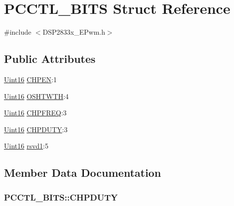 \hypertarget{struct_p_c_c_t_l___b_i_t_s}{}\section{P\+C\+C\+T\+L\+\_\+\+B\+I\+T\+S Struct Reference}
\label{struct_p_c_c_t_l___b_i_t_s}


{\ttfamily \#include $<$D\+S\+P2833x\+\_\+\+E\+Pwm.\+h$>$}

\subsection*{Public Attributes}
\begin{DoxyCompactItemize}
\item 
\hyperlink{_d_s_p2833x___device_8h_a59a9f6be4562c327cbfb4f7e8e18f08b}{Uint16} \hyperlink{struct_p_c_c_t_l___b_i_t_s_a0b4bc7768b79be8f8af5bd9af3bf050a}{C\+H\+P\+E\+N}\+:1
\item 
\hyperlink{_d_s_p2833x___device_8h_a59a9f6be4562c327cbfb4f7e8e18f08b}{Uint16} \hyperlink{struct_p_c_c_t_l___b_i_t_s_ae278a0bc2c79ef54ecbc29fca4518851}{O\+S\+H\+T\+W\+T\+H}\+:4
\item 
\hyperlink{_d_s_p2833x___device_8h_a59a9f6be4562c327cbfb4f7e8e18f08b}{Uint16} \hyperlink{struct_p_c_c_t_l___b_i_t_s_a8bdfb308ef78915633cfb18cd76ed153}{C\+H\+P\+F\+R\+E\+Q}\+:3
\item 
\hyperlink{_d_s_p2833x___device_8h_a59a9f6be4562c327cbfb4f7e8e18f08b}{Uint16} \hyperlink{struct_p_c_c_t_l___b_i_t_s_afe02901833db45444ce3c97305248e8c}{C\+H\+P\+D\+U\+T\+Y}\+:3
\item 
\hyperlink{_d_s_p2833x___device_8h_a59a9f6be4562c327cbfb4f7e8e18f08b}{Uint16} \hyperlink{struct_p_c_c_t_l___b_i_t_s_a7ea0e817ae5dd68a7d1f1ce0085618d3}{rsvd1}\+:5
\end{DoxyCompactItemize}


\subsection{Member Data Documentation}
\hypertarget{struct_p_c_c_t_l___b_i_t_s_afe02901833db45444ce3c97305248e8c}{}
\subsubsection[{C\+H\+P\+D\+U\+T\+Y}]{ P\+C\+C\+T\+L\+\_\+\+B\+I\+T\+S\+::\+C\+H\+P\+D\+U\+T\+Y}\label{struct_p_c_c_t_l___b_i_t_s_afe02901833db45444ce3c97305248e8c}
\hypertarget{struct_p_c_c_t_l___b_i_t_s_a0b4bc7768b79be8f8af5bd9af3bf050a}{}
